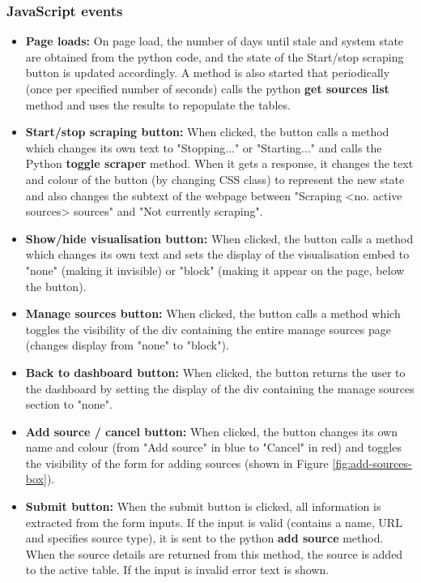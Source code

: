 \documentclass{l4proj}
\begin{document}
\subsubsection{JavaScript events}
\begin{itemize}
    \item \textbf{Page loads: } On page load, the number of days until stale and system state are obtained from the python code, and the state of the Start/stop scraping button is updated accordingly. A method is also started that periodically (once per specified number of seconds) calls the python \textbf{get sources list} method and uses the results to repopulate the tables.
    \item \textbf{Start/stop scraping button:} When clicked, the button calls a method which changes its own text to "Stopping..." or "Starting..." and calls the Python \textbf{toggle scraper} method. When it gets a response, it changes the text and colour of the button (by changing CSS class) to represent the new state and also changes the subtext of the webpage between "Scraping <no. active sources> sources" and "Not currently scraping".
    \item \textbf{Show/hide visualisation button: } When clicked, the button calls a method which changes its own text and sets the display of the visualisation embed to "none" (making it invisible) or "block" (making it appear on the page, below the button).
    \item \textbf{Manage sources button: } When clicked, the button calls a method which toggles the visibility of the div containing the entire manage sources page (changes display from "none" to "block").
    \item \textbf{Back to dashboard button: } When clicked, the button returns the user to the dashboard by setting the display of the div containing the manage sources section to "none".
    \item \textbf{Add source / cancel button: } When clicked, the button changes its own name and colour (from "Add source" in blue to "Cancel" in red) and toggles the visibility of the form for adding sources (shown in Figure \ref{fig:add-sources-box}).
    \item \textbf{Submit button: } When the submit button is clicked, all information is extracted from the form inputs. If the input is valid (contains a name, URL and specifies source type), it is sent to the python \textbf{add source} method. When the source details are returned from this method, the source is added to the active table. If the input is invalid error text is shown.

\end{itemize}
\end{document}
